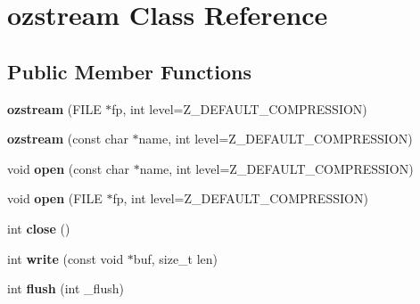 \hypertarget{classozstream}{\section{ozstream Class Reference}
\label{classozstream}
}
\subsection*{Public Member Functions}
\begin{DoxyCompactItemize}
\item 
\hypertarget{classozstream_add8c121cdb4538f9f2de2d517c640e61}{{\bfseries ozstream} (F\+I\+L\+E $\ast$fp, int level=Z\+\_\+\+D\+E\+F\+A\+U\+L\+T\+\_\+\+C\+O\+M\+P\+R\+E\+S\+S\+I\+O\+N)}\label{classozstream_add8c121cdb4538f9f2de2d517c640e61}

\item 
\hypertarget{classozstream_af30abfcf07fef0000c7fd3e4ab89eb85}{{\bfseries ozstream} (const char $\ast$name, int level=Z\+\_\+\+D\+E\+F\+A\+U\+L\+T\+\_\+\+C\+O\+M\+P\+R\+E\+S\+S\+I\+O\+N)}\label{classozstream_af30abfcf07fef0000c7fd3e4ab89eb85}

\item 
\hypertarget{classozstream_aea598e6f8f3bb1ffff903546d98b14f0}{void {\bfseries open} (const char $\ast$name, int level=Z\+\_\+\+D\+E\+F\+A\+U\+L\+T\+\_\+\+C\+O\+M\+P\+R\+E\+S\+S\+I\+O\+N)}\label{classozstream_aea598e6f8f3bb1ffff903546d98b14f0}

\item 
\hypertarget{classozstream_aa5ccfff4546c31dd1f9cd78ad02d446f}{void {\bfseries open} (F\+I\+L\+E $\ast$fp, int level=Z\+\_\+\+D\+E\+F\+A\+U\+L\+T\+\_\+\+C\+O\+M\+P\+R\+E\+S\+S\+I\+O\+N)}\label{classozstream_aa5ccfff4546c31dd1f9cd78ad02d446f}

\item 
\hypertarget{classozstream_a1f5bf09289fa67b17e768435cf4f01f1}{int {\bfseries close} ()}\label{classozstream_a1f5bf09289fa67b17e768435cf4f01f1}

\item 
\hypertarget{classozstream_a2dbcc101aa6e94eb2ca866e9b8db4c84}{int {\bfseries write} (const void $\ast$buf, size\+\_\+t len)}\label{classozstream_a2dbcc101aa6e94eb2ca866e9b8db4c84}

\item 
\hypertarget{classozstream_a0fc1b5181044b8d6b6aed0381e8f449c}{int {\bfseries flush} (int \+\_\+flush)}\label{classozstream_a0fc1b5181044b8d6b6aed0381e8f449c}


\end{DoxyCompactItemize}
